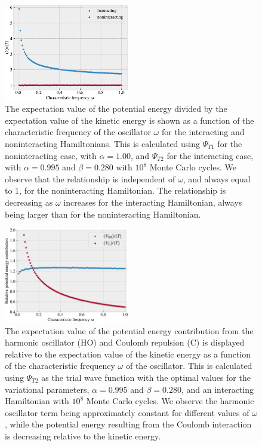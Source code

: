 \documentclass[%
 reprint,
nofootinbib,
aps,
]{revtex4-1}
\begin{document}
\begin{figure}
  \centering
  \includegraphics[width=0.485\textwidth]{../figures/virial.pdf}
  \caption{The expectation value of the potential energy divided by the expectation value of the kinetic energy is shown as a function of the characteristic frequency of the oscillator $\omega$ for the interacting and noninteracting Hamiltonians. This is calculated using $\Psi_{T1}$ for the noninteracting case, with $\alpha=1.00$, and $\Psi_{T2}$ for the interacting case, with $\alpha=0.995$ and $\beta=0.280$ with $10^{8}$ Monte Carlo cycles. We observe that the relationship is independent of $\omega$, and always equal to $1$, for the noninteracting Hamiltonian. The relationship is decreasing as $\omega$ increases for the interacting Hamiltonian, always being larger than for the noninteracting Hamiltonian.}
  \label{fig:virial}
\end{figure}


\begin{figure}
  \centering
  \includegraphics[width=0.485\textwidth]{../figures/H0_vs_C.pdf}
  \caption{The expectation value of the potential energy contribution from the harmonic oscillator (HO) and Coulomb repulsion (C) is displayed relative to the expectation value of the kinetic energy as a function of the characteristic frequency $\omega$ of the oscillator. This is calculated using $\Psi_{T2}$ as the trial wave function with the optimal values for the variational parameters, $\alpha=0.995$ and $\beta=0.280$, and an interacting Hamiltonian with $10^{8}$ Monte Carlo cycles. We observe the harmonic oscillator term being approximately constant for different values of $\omega$, while the potential energy resulting from the Coulomb interaction is decreasing relative to the kinetic energy.}
  \label{fig:H0_vs_C}
\end{figure}
\end{document}
